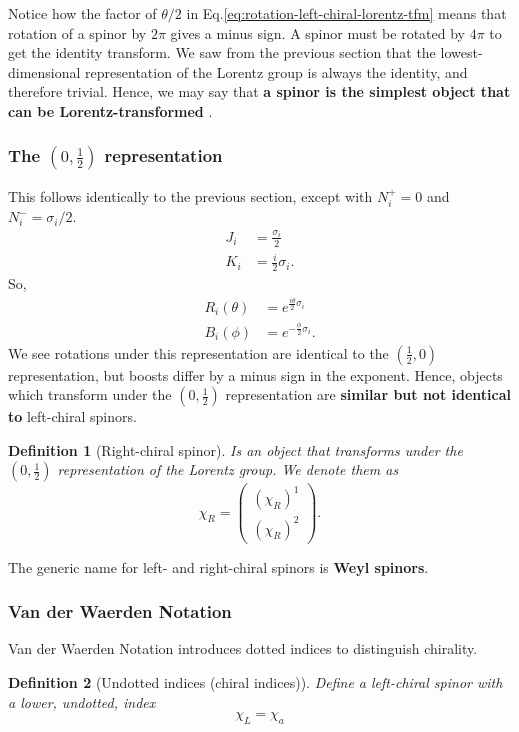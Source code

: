 \documentclass[11pt]{article}
\numberwithin{equation}{section}
\newtheorem{defn}{Definition}[section]
\begin{document}
Notice how the factor of $\theta/2$ in Eq.\eqref{eq:rotation-left-chiral-lorentz-tfm} means that rotation of a spinor by $2\pi$ gives a minus sign. A spinor must be rotated by $4\pi$ to get the identity transform. We saw from the previous section that the lowest-dimensional representation of the Lorentz group is always the identity, and therefore trivial. Hence, we may say that \textbf{a spinor is the simplest object that can be Lorentz-transformed} \citep{Steane13}.

\subsubsection{The $(0, \frac{1}{2})$ representation}
This follows identically to the previous section, except with $N_i^+=0$ and $N_i^- = \sigma_i/2$. 
\begin{align}
J_i &= \frac{\sigma_i}{2} \\
K_i &= \frac{i}{2} \sigma_i.
\end{align}
So,
\begin{align}
R_i(\theta) &= e^{\frac{i \theta}{2}  \sigma_i} \\
B_i(\phi) &= e^{-\frac{\phi}{2}  \sigma_i}.
\end{align}
We see rotations under this representation are identical to the $(\frac{1}{2},0)$ representation, but boosts differ by a minus sign in the exponent. Hence, objects which transform under the $(0, \frac{1}{2})$ representation are \textbf{similar but not identical to} left-chiral spinors.
\begin{defn}[Right-chiral spinor]
Is an object that transforms under the $(0, \frac{1}{2})$ representation of the Lorentz group. We denote them as 
\begin{equation}
\chi_R = \begin{pmatrix}
(\chi_R)^1 \\
(\chi_R)^2 
\end{pmatrix}.
\end{equation}
\end{defn}
\noindent The generic name for left- and right-chiral spinors is \textbf{Weyl spinors}.

\subsubsection{Van der Waerden Notation}

Van der Waerden Notation introduces dotted indices to distinguish chirality.

\begin{defn}[Undotted indices (chiral indices)]
Define a left-chiral spinor with a lower, undotted, index
\begin{equation}
\chi_L = \chi_a
\end{equation}
\end{defn}
\end{document}
